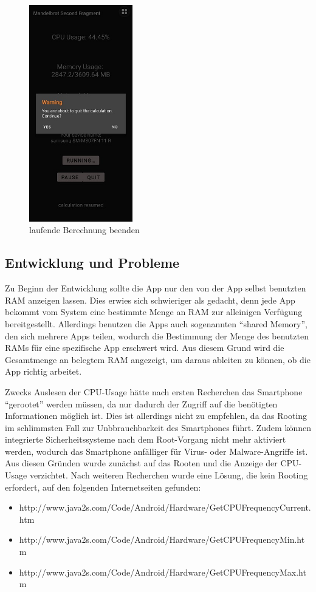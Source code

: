 \documentclass[12pt, onecolumn, notitlepage]{scrartcl}
\begin{document}
\begin{figure}[H] 
	\centering
	\includegraphics[height=0.5\textheight,width=0.4\textwidth]{calc_quit.jpg}
	\caption{laufende Berechnung beenden}
\end{figure}


\subsection{Entwicklung und Probleme}
Zu Beginn der Entwicklung sollte die App nur den von der App selbst benutzten RAM anzeigen lassen. Dies erwies sich schwieriger als gedacht, denn jede App bekommt vom System eine bestimmte Menge an RAM zur alleinigen Verfügung bereitgestellt. Allerdings benutzen die Apps auch sogenannten \enquote{shared Memory}, den sich mehrere Apps teilen, wodurch die Bestimmung der Menge des benutzten RAMs für eine spezifische App erschwert wird. Aus diesem Grund wird die Gesamtmenge an belegtem RAM angezeigt, um daraus ableiten zu können, ob die App richtig arbeitet. \par
Zwecks Auslesen der CPU-Usage hätte nach ersten Recherchen das Smartphone \enquote{gerootet} werden müssen, da nur dadurch der Zugriff auf die benötigten Informationen möglich ist. Dies ist allerdings nicht zu empfehlen, da das Rooting im schlimmsten Fall zur Unbbrauchbarkeit des Smartphones führt. Zudem können integrierte Sicherheitssysteme nach dem Root-Vorgang nicht mehr aktiviert werden, wodurch das Smartphone anfälliger für Virus- oder Malware-Angriffe ist. Aus diesen Gründen wurde zunächst auf das Rooten und die Anzeige der CPU-Usage verzichtet. Nach weiteren Recherchen wurde eine Lösung, die kein Rooting erfordert, auf den folgenden Internetseiten gefunden:
\begin{itemize}
	\itemsep0pt
	\item http://www.java2s.com/Code/Android/Hardware/GetCPUFrequencyCurrent.htm
	\item http://www.java2s.com/Code/Android/Hardware/GetCPUFrequencyMin.htm
	\item http://www.java2s.com/Code/Android/Hardware/GetCPUFrequencyMax.htm 
\end{itemize}
\end{document}
